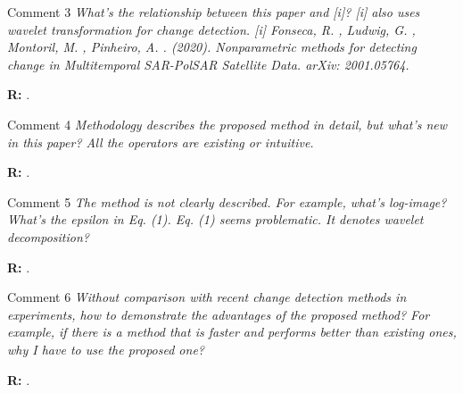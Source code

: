 \documentclass[11pt]{report}
\begin{document}
\vspace{0.3cm}


\medskip
\begin{mybox}{Comment 3}
\textit{What’s the relationship between this paper and [i]? [i] also uses wavelet transformation for change detection.
[i] Fonseca, R. , Ludwig, G. , Montoril, M. , Pinheiro, A. . (2020). Nonparametric methods for detecting change in Multitemporal SAR-PolSAR Satellite Data. arXiv: 2001.05764.}

\medskip

\textbf{R:} .

\medskip


\end{mybox}

\vspace{0.3cm}


\medskip
\begin{mybox}{Comment 4}
\textit{Methodology describes the proposed method in detail, but what’s new in this paper? All the operators are existing or
intuitive.}

\medskip

\textbf{R:} .

\medskip


\end{mybox}

\vspace{0.3cm}

\medskip
\begin{mybox}{Comment 5}
\textit{The method is not clearly described. For example, what’s log-image? What’s the epsilon in Eq. (1). Eq. (1) seems
problematic. It denotes wavelet decomposition?}


\medskip
\textbf{R:} .

\medskip

\end{mybox}

\vspace{0.3cm}

\medskip
\begin{mybox}{Comment 6}
\textit{Without comparison with recent change detection methods in experiments, how to demonstrate the advantages of the
proposed method? For example, if there is a method that is faster and performs better than existing ones, why I have to
use the proposed one?}


\medskip
\textbf{R:} .

\medskip

\end{mybox}
\end{document}
